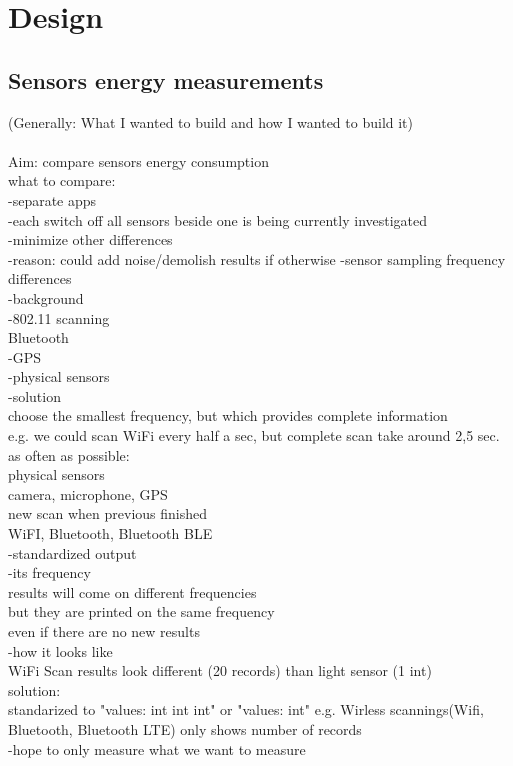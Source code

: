 \section{Design}
\label{s:design}
\subsection{Sensors energy measurements}

(Generally: What I wanted to build and how I wanted to build it)\\
\\
Aim: compare sensors energy consumption\\

what to compare:\\
	-separate apps\\
	-each switch off all sensors beside one is being currently investigated\\
	-minimize other differences \\
		-reason: could add noise/demolish results  if otherwise
		-sensor sampling frequency differences\\
			-background\\
				-802.11 scanning\\
					Bluetooth\\
				-GPS\\
				-physical sensors\\
			-solution\\
				choose the smallest frequency, but which provides complete information\\
					e.g. we could scan WiFi every half a sec, but complete scan take around 2,5 sec.\\
				as often as possible:\\
					physical sensors\\
					camera, microphone, GPS\\	
				new scan when previous finished\\
					WiFI, Bluetooth, Bluetooth BLE\\
		-standardized output\\
				-its frequency\\
					results will come on different frequencies\\
					but they are printed on the same frequency\\
						even if there are no new results\\
				-how it looks like\\
					WiFi Scan results look different (20 records) than light sensor (1 int)\\
					solution:\\
						standarized to "values: int int int" or "values: int"
							e.g. Wirless scannings(Wifi, Bluetooth, Bluetooth LTE) only shows number of records\\
		-hope to only measure what we want to measure\\				
				
